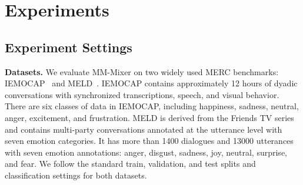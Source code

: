 \documentclass[letterpaper]{article} %
\begin{document}
\begin{table}[t]
\centering
{}
\caption{Trainable downstream parameters in millions. Pretrained
feature extractors are excluded.}
\label{tab:model_parameters}
\end{table}

\section{Experiments}
\subsection{Experiment Settings}

\noindent\textbf{Datasets.}
We evaluate MM-Mixer on two widely used MERC benchmarks:
IEMOCAP~\cite{iemocap} and MELD~\cite{meld}. IEMOCAP contains
approximately 12 hours of dyadic conversations with synchronized
transcriptions, speech, and visual behavior. There are six classes of data in IEMOCAP, including happiness, sadness, neutral, anger, excitement, and frustration.
MELD is derived from the Friends TV series and contains multi-party conversations annotated at the utterance level with seven emotion categories.  It has more than 1400 dialogues and 13000 utterances with seven emotion annotations: anger, disgust, sadness, joy, neutral, surprise, and fear. We follow the standard train, validation, and test splits and classification settings for both datasets.
\end{document}
